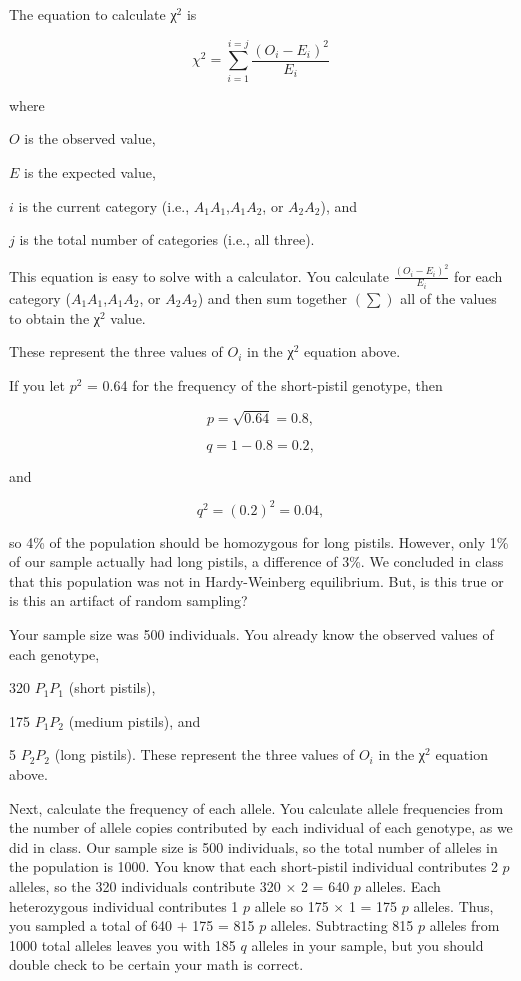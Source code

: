 \documentclass[12pt]{exam}
\begin{document}
\begin{questions}
The equation to calculate χ$^2$ is 

 \[\chi^2 = \sum_{i=1}^{i=j}\frac{(O_i - E_i)^2}{E_i} \]

where 

$O$ is the observed value,
 
$E$ is the expected value,
 
$i$ is the current category (i.e., $A_1A_1$,$ A_1A_2$, or $A_2A_2$), and
 
$j$ is the total number of categories (i.e., all three).\vspace{\baselineskip}

This equation is easy to solve with a calculator. You calculate $\frac{(O_i - E_i)^2}{E_i}$ for each category ($A_1A_1$,$ A_1A_2$, or $A_2A_2$) and then sum together $(\sum)$ all of the values to obtain the χ$^2$ value. 



These represent the three values of $O_i$ in the χ$^2$ equation above. \vspace{\baselineskip}


If you let $p^2$ = 0.64 for the frequency of the short-pistil genotype, then

\[p=\sqrt{0.64}=0.8,\]

\[q=1-0.8=0.2,\]

and

\[q^2=(0.2)^2=0.04,\]

\noindent so 4\% of the population should be homozygous for long pistils. However, only 1\% of our sample actually had long pistils, a difference of 3\%. We concluded in class that this population was not in Hardy-Weinberg equilibrium. But, is this true or is this an artifact of random sampling?

Your sample size was 500 individuals. You already know the observed values of each genotype,\vspace{\baselineskip}

320 $P_1P_1$ (short pistils),

175 $P_1P_2$ (medium pistils), and

5 $P_2P_2$ (long pistils). These represent the three values of $O_i$ in the χ$^2$ equation above. \vspace{\baselineskip}

Next, calculate the frequency of each allele. You calculate allele frequencies from the number of allele copies contributed by each individual of each genotype, as we did in class. Our sample size is 500 individuals, so the total number of alleles in the population is 1000. You know that each short-pistil individual contributes 2 $p$ alleles, so the 320 individuals contribute 320 $\times$ 2 = 640 $p$ alleles. Each heterozygous individual contributes 1 $p$ allele so 175 $\times$ 1 = 175 $p$ alleles. Thus, you sampled a total of 640 $+$ 175 = 815 $p$ alleles. Subtracting 815 $p$ alleles from 1000 total alleles leaves you with 185 $q$ alleles in your sample, but you should double check to be certain your math is correct.


\end{questions}
\end{document}
